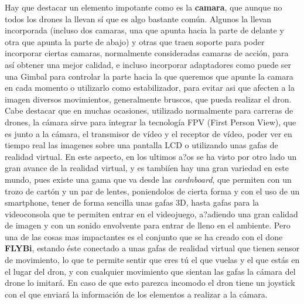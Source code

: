 \hspace{1 cm} Hay que destacar un elemento impotante como es la \textbf{camara}, que aunque no todos los drones la llevan s\'i que es algo bastante com\'un. Algunos la llevan incorporada (incluso dos camaras, una que apunta hacia la parte de delante y otra que apunta la parte de abajo) y otras que traen soporte para poder incorporar ciertas camaras, normalmente consideradas camaras de acci\'on, para as\'i obtener una mejor calidad, e incluso incorporar adaptadores como puede ser una Gimbal para controlar la parte hacia la que queremos que apunte la camara en cada momento o utilizarlo como estabilizador, para evitar asi que afecten a la imagen diversos movimientos, generalmente bruscos, que pueda realizar el dron. Cabe destacar que en muchas ocasiones, utilizado normalmente para carreras de drones, la c\'amara sirve para integrar la tecnolog\'ia FPV (First Person View), que es junto a la c\'amara, el transmisor de v\'ideo y el receptor de v\'ideo, poder ver en tiempo real las imagenes sobre una pantalla LCD o utilizando unas gafas de realidad virtual. En este aspecto, en los ultimos a?os se ha visto por otro lado un gran avance de la realidad virtual, y es tambi\'ien hay una gran variedad en este mundo, pues existe una gama que va desde las \emph{cardnboard}, que permiten con un trozo de cart\'on y un par de lentes, poniendolos de cierta forma y con el uso de un smartphone, tener de forma sencilla unas gafas 3D, hasta gafas para la videoconsola que te permiten entrar en el videojuego, a?adiendo una gran calidad de imagen y con un sonido envolvente para entrar de lleno en el ambiente. Pero una de las cosas mas impactantes es el conjunto que se ha creado con el done \textbf{FLYBi}, estando \'este conectado a unas gafas de realidad virtual que tienen sensor de movimiento, lo que te permite sentir que eres t\'u el que vuelas y el que est\'as en el lugar del dron, y con cualquier movimiento que sientan las gafas la c\'amara del drone lo imitar\'a. En caso de que esto parezca incomodo el dron tiene un joystick con el que enviar\'a la informaci\'on de los elementos a realizar a la c\'amara. 
 

